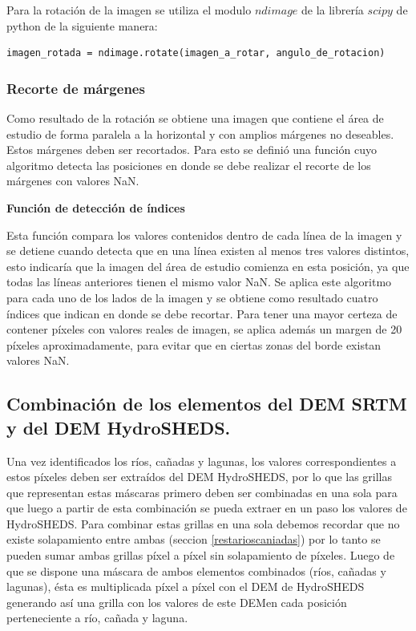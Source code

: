 \documentclass[10pt,a4paper, twoside]{report}
\begin{document}
Para la rotación de la imagen se utiliza el modulo $ndimage$ de la librería $scipy$ de python de la siguiente manera:

\begin{lstlisting}
imagen_rotada = ndimage.rotate(imagen_a_rotar, angulo_de_rotacion)
\end{lstlisting}

\subsubsection{Recorte de márgenes}

Como resultado de la rotación se obtiene una imagen que contiene el área de estudio de forma paralela a la horizontal y con amplios márgenes no deseables. Estos márgenes deben ser recortados. Para esto se definió una función cuyo algoritmo detecta las posiciones en donde se debe realizar el recorte de los márgenes con valores NaN.

\textbf{Función de detección de índices}

Esta función compara los valores contenidos dentro de cada línea de la imagen y se detiene cuando detecta que en una línea existen al menos tres valores distintos, esto indicaría que la imagen del área de estudio comienza en esta posición, ya que todas las líneas anteriores tienen el mismo valor NaN. Se aplica este algoritmo para cada uno de los lados de la imagen y se obtiene como resultado cuatro índices que indican en donde se debe recortar. Para tener una mayor certeza de contener píxeles con valores reales de imagen, se aplica además un margen de 20 píxeles aproximadamente, para evitar que en ciertas zonas del borde existan valores NaN.



\subsection{Combinación de los elementos del DEM SRTM y del DEM HydroSHEDS.}

Una vez identificados los ríos, cañadas y lagunas, los valores correspondientes a estos píxeles deben ser extraídos del DEM HydroSHEDS, por lo que las grillas que representan estas máscaras primero deben ser combinadas en una sola para que luego a partir de esta combinación se pueda extraer en un paso los valores de HydroSHEDS. Para combinar estas grillas en una sola debemos recordar que no existe solapamiento entre ambas (seccion \ref{restarioscaniadas}) por lo tanto se pueden sumar ambas grillas píxel a píxel sin solapamiento de píxeles. Luego de que se dispone una máscara de ambos elementos combinados (ríos, cañadas y lagunas), ésta es multiplicada píxel a píxel con el DEM de HydroSHEDS generando así una grilla con los valores de este DEMen cada posición perteneciente a río, cañada y laguna.
\end{document}
